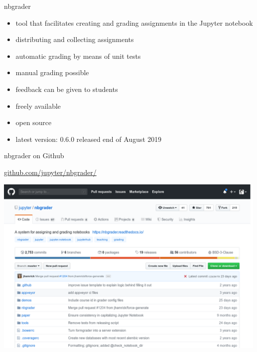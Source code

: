 \documentclass[svgnames]{beamer}
\begin{document}
\begin{frame}{nbgrader}
 \begin{itemize}
  \item tool that facilitates creating and grading assignments in the Jupyter notebook
  \item distributing and collecting assignments
  \item automatic grading by means of unit tests
  \item manual grading possible
  \item feedback can be given to students
 \end{itemize}

 \begin{itemize}
  \item freely available
  \item open source
  \item latest version: 0.6.0 released end of August 2019
 \end{itemize}
\end{frame}

\begin{frame}{nbgrader on Github}
 \begin{center}
  \url{github.com/jupyter/nbgrader/}

  \vspace{0.3truecm}
  \includegraphics[width=\textwidth]{nbgrader_github}
 \end{center}
\end{frame}
\end{document}
